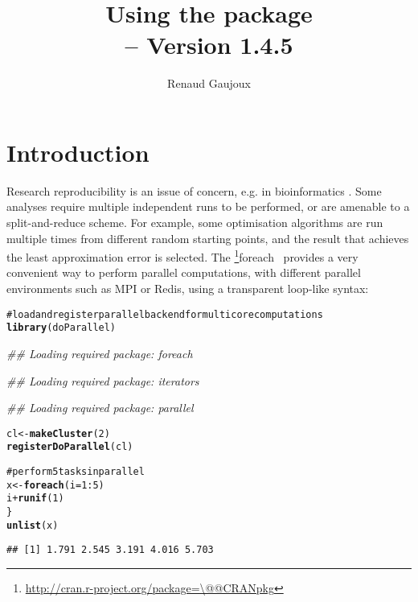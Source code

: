 \documentclass[a4paper,12pt]{article}\usepackage{graphicx, color}
\title{Using the \code{doRNG} package\\
{\small \Rpkg{doRNG} -- Version 1.4.5}}
\author{Renaud Gaujoux}
\makeatletter
\newcommand{\hlfunctioncall}[1]{\textcolor[rgb]{0.501960784313725,0,0.329411764705882}{\textbf{#1}}}%
\newcommand{\hlcomment}[1]{\textcolor[rgb]{0.180392156862745,0.6,0.341176470588235}{#1}}%
\newenvironment{kframe}{%
 \def\at@end@of@kframe{}%
 \ifinner\ifhmode%
  \def\at@end@of@kframe{\end{minipage}}%
  \begin{minipage}{\columnwidth}%
 \fi\fi%
 \def\FrameCommand##1{\hskip\@totalleftmargin \hskip-\fboxsep
 \colorbox{shadecolor}{##1}\hskip-\fboxsep
     \hskip-\linewidth \hskip-\@totalleftmargin \hskip\columnwidth}%
 \MakeFramed {\advance\hsize-\width
   \@totalleftmargin\z@ \linewidth\hsize
   \@setminipage}}%
 {\par\unskip\endMakeFramed%
 \at@end@of@kframe}
\newenvironment{knitrout}{}{} %
\renewenvironment{knitrout}{\begin{footnotesize}}{\end{footnotesize}}
\newcommand{\pkgname}[1]{\textit{#1}\xspace}
\newcommand{\CRANurl}[1]{\url{http://cran.r-project.org/package=#1}}
\def\CRANpkg{\@ifstar\@CRANpkg\@@CRANpkg}
\def\@CRANpkg#1{\href{http://cran.r-project.org/package=#1}{\pkgname{#1}}\footnote{\CRANurl{#1}}}
\def\@@CRANpkg#1{\href{http://cran.r-project.org/package=#1}{\pkgname{#1}} package\footnote{\CRANurl{#1}}}
\newcommand{\citeCRANpkg}[1]{\CRANpkg{#1}~\cite{#1}}
\makeatother
\begin{document}
\maketitle

\tableofcontents

\section*{Introduction}

Research reproducibility is an issue of concern, e.g. in bioinformatics
\cite{Hothorn2011,Stodden2011,Ioannidis2008}.
Some analyses require multiple independent runs to be performed, or are amenable to a split-and-reduce scheme.
For example, some optimisation algorithms are run multiple times from different
random starting points, and the result that achieves the least approximation error is selected.
The \citeCRANpkg{foreach} provides a very convenient way to perform parallel computations, with different parallel environments such as MPI or Redis, using a transparent loop-like syntax:




\begin{knitrout}
\color{fgcolor}\begin{kframe}
\begin{alltt}
\hlcomment{# load and register parallel backend for multicore computations}
\hlfunctioncall{library}(doParallel)
\end{alltt}


{\ttfamily\noindent\itshape\textcolor{messagecolor}{\#\# Loading required package: foreach}}

{\ttfamily\noindent\itshape\textcolor{messagecolor}{\#\# Loading required package: iterators}}

{\ttfamily\noindent\itshape\textcolor{messagecolor}{\#\# Loading required package: parallel}}\begin{alltt}
cl <- \hlfunctioncall{makeCluster}(2)
\hlfunctioncall{registerDoParallel}(cl)

\hlcomment{# perform 5 tasks in parallel}
x <- \hlfunctioncall{foreach}(i = 1:5) %dopar% \{
    i + \hlfunctioncall{runif}(1)
\}
\hlfunctioncall{unlist}(x)
\end{alltt}
\begin{verbatim}
## [1] 1.791 2.545 3.191 4.016 5.703
\end{verbatim}
\end{kframe}
\end{knitrout}
\end{document}
